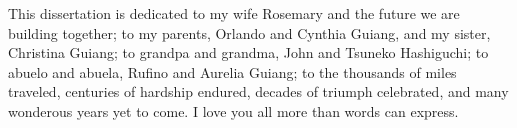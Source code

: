 \begin{dedication}
\setsinglespacing
\parindent0pt\parskip\baselineskip
\begin{center}
This dissertation is dedicated to my wife Rosemary and the future we are building together; 
to my parents, Orlando and Cynthia Guiang, and my sister, Christina Guiang; 
to grandpa and grandma, John and Tsuneko Hashiguchi; 
to abuelo and abuela, Rufino and Aurelia Guiang; 
to the thousands of miles traveled, centuries of hardship endured, decades of triumph celebrated, and many wonderous years yet to come. 
I love you all more than words can express.
\end{center}
\end{dedication}

